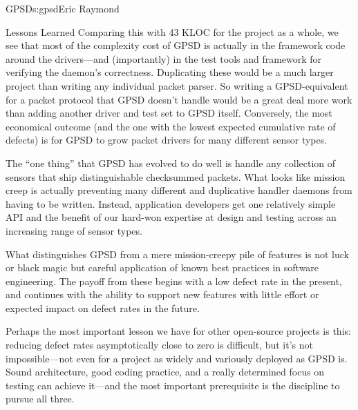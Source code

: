 \begin{aosachapter}{GPSD}{s:gpsd}{Eric Raymond}
\begin{aosasect1}{Lessons Learned}
Comparing this with 43 KLOC for the project as a whole, we see that
most of the complexity cost of GPSD is actually in the framework code
around the drivers---and (importantly) in the test tools and framework
for verifying the daemon's correctness.  Duplicating these would be a
much larger project than writing any individual packet parser.  So
writing a GPSD-equivalent for a packet protocol that GPSD doesn't
handle would be a great deal more work than adding another driver and
test set to GPSD itself.  Conversely, the most economical outcome (and
the one with the lowest expected cumulative rate of defects) is for
GPSD to grow packet drivers for many different sensor types.

The ``one thing'' that GPSD has evolved to do well is handle any
collection of sensors that ship distinguishable checksummed packets.
What looks like mission creep is actually preventing many different
and duplicative handler daemons from having to be written.  Instead,
application developers get one relatively simple API and the benefit
of our hard-won expertise at design and testing across an increasing
range of sensor types.

What distinguishes GPSD from a mere mission-creepy pile of features is
not luck or black magic but careful application of known best
practices in software engineering.  The payoff from these begins with
a low defect rate in the present, and continues with the ability to
support new features with little effort or expected impact on defect
rates in the future.

Perhaps the most important lesson we have for other open-source
projects is this: reducing defect rates asymptotically close to zero
is difficult, but it's not impossible---not even for a project as
widely and variously deployed as GPSD is.  Sound architecture, good
coding practice, and a really determined focus on testing can achieve
it---and the most important prerequisite is the discipline to pursue
all three.

\end{aosasect1}

\end{aosachapter}
